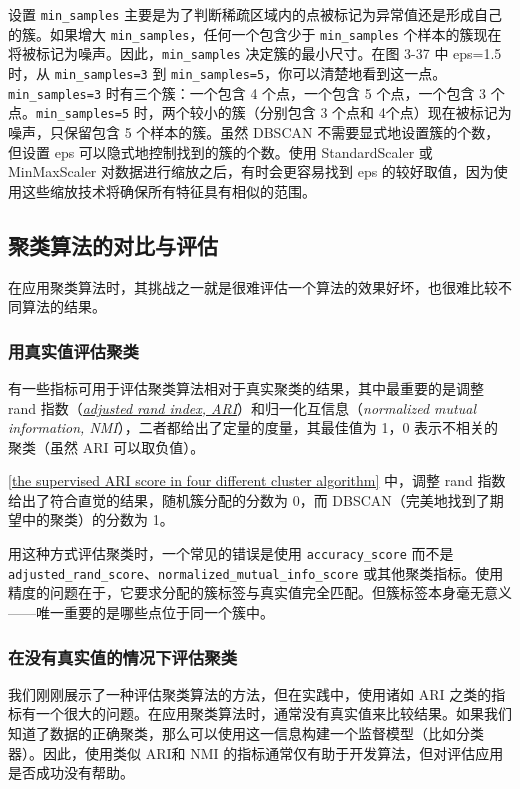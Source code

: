 设置 \verb|min_samples| 主要是为了判断稀疏区域内的点被标记为异常值还是形成自己的簇。如果增大 \verb|min_samples|，任何一个包含少于 \verb|min_samples| 个样本的簇现在将被标记为噪声。因此，\verb|min_samples| 决定簇的最小尺寸。在图 3-37 中 eps=1.5 时，从 \verb|min_samples=3| 到 \verb|min_samples=5|，你可以清楚地看到这一点。\verb|min_samples=3| 时有三个簇：一个包含 4 个点，一个包含 5 个点，一个包含 3 个点。\verb|min_samples=5| 时，两个较小的簇（分别包含 3 个点和 4个点）现在被标记为噪声，只保留包含 5 个样本的簇。虽然 DBSCAN 不需要显式地设置簇的个数，但设置 eps 可以隐式地控制找到的簇的个数。使用 StandardScaler 或 MinMaxScaler 对数据进行缩放之后，有时会更容易找到 eps 的较好取值，因为使用这些缩放技术将确保所有特征具有相似的范围。

\subsection{聚类算法的对比与评估}
在应用聚类算法时，其挑战之一就是很难评估一个算法的效果好坏，也很难比较不同算法的结果。
\subsubsection{用真实值评估聚类}
有一些指标可用于评估聚类算法相对于真实聚类的结果，其中最重要的是调整 rand 指数（\href{https://scikit-learn.org/stable/modules/generated/sklearn.metrics.adjusted_rand_score.html}{\emph{adjusted rand index, ARI}}）和归一化互信息（\emph{normalized mutual information, NMI}），二者都给出了定量的度量，其最佳值为 1，0 表示不相关的聚类（虽然 ARI 可以取负值）。


\autoref{the supervised ARI score in four different cluster algorithm} 中，调整 rand 指数给出了符合直觉的结果，随机簇分配的分数为 0，而 DBSCAN（完美地找到了期望中的聚类）的分数为 1。
\begin{tcolorbox}[colframe=red]
    用这种方式评估聚类时，一个常见的错误是使用 \verb|accuracy_score| 而不是 \verb|adjusted_rand_score|、\verb|normalized_mutual_info_score| 或其他聚类指标。使用精度的问题在于，它要求分配的簇标签与真实值完全匹配。但簇标签本身毫无意义——唯一重要的是哪些点位于同一个簇中。
\end{tcolorbox}
\subsubsection{在没有真实值的情况下评估聚类}
我们刚刚展示了一种评估聚类算法的方法，但在实践中，使用诸如 ARI 之类的指标有一个很大的问题。在应用聚类算法时，通常没有真实值来比较结果。如果我们知道了数据的正确聚类，那么可以使用这一信息构建一个监督模型（比如分类器）。因此，使用类似 ARI和 NMI 的指标通常仅有助于开发算法，但对评估应用是否成功没有帮助。

